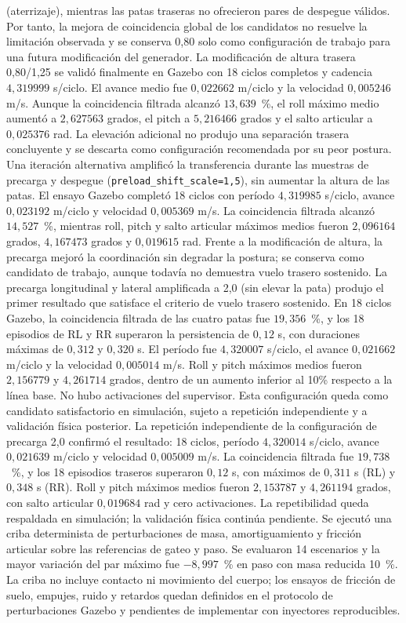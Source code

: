 (aterrizaje), mientras las patas traseras no ofrecieron pares de despegue
válidos. Por tanto, la mejora de coincidencia global de los candidatos no
resuelve la limitación observada y se conserva 0,80 solo como configuración de
trabajo para una futura modificación del generador.
La modificación de altura trasera 0,80/1,25 se validó finalmente en Gazebo con
18 ciclos completos y cadencia $4{,}319999$ s/ciclo. El avance medio fue
$0{,}022662$ m/ciclo y la velocidad $0{,}005246$ m/s. Aunque la coincidencia
filtrada alcanzó $13{,}639$~\%, el roll máximo medio aumentó a $2{,}627563$
grados, el pitch a $5{,}216466$ grados y el salto articular a $0{,}025376$ rad.
La elevación adicional no produjo una separación trasera concluyente y se
descarta como configuración recomendada por su peor postura.
Una iteración alternativa amplificó la transferencia durante las muestras de
precarga y despegue (\texttt{preload\_shift\_scale=1,5}), sin aumentar la altura de las
patas. El ensayo Gazebo completó 18 ciclos con período $4{,}319985$ s/ciclo,
avance $0{,}023192$ m/ciclo y velocidad $0{,}005369$ m/s. La coincidencia
filtrada alcanzó $14{,}527$~\%, mientras roll, pitch y salto articular máximos
medios fueron $2{,}096164$ grados, $4{,}167473$ grados y $0{,}019615$ rad.
Frente a la modificación de altura, la precarga mejoró la coordinación sin
degradar la postura; se conserva como candidato de trabajo, aunque todavía no
demuestra vuelo trasero sostenido.
La precarga longitudinal y lateral amplificada a 2,0 (sin elevar la pata)
produjo el primer resultado que satisface el criterio de vuelo trasero sostenido.
En 18 ciclos Gazebo, la coincidencia filtrada de las cuatro patas fue
$19{,}356$~\%, y los 18 episodios de RL y RR superaron la persistencia de
$0{,}12$ s, con duraciones máximas de $0{,}312$ y $0{,}320$ s. El período fue
$4{,}320007$ s/ciclo, el avance $0{,}021662$ m/ciclo y la velocidad
$0{,}005014$ m/s. Roll y pitch máximos medios fueron $2{,}156779$ y
$4{,}261714$ grados, dentro de un aumento inferior al 10\% respecto a la línea
base. No hubo activaciones del supervisor. Esta configuración queda como
candidato satisfactorio en simulación, sujeto a repetición independiente y a
validación física posterior.
La repetición independiente de la configuración de precarga 2,0 confirmó el
resultado: 18 ciclos, período $4{,}320014$ s/ciclo, avance $0{,}021639$
m/ciclo y velocidad $0{,}005009$ m/s. La coincidencia filtrada fue
$19{,}738$~\%, y los 18 episodios traseros superaron $0{,}12$ s, con máximos de
$0{,}311$ s (RL) y $0{,}348$ s (RR). Roll y pitch máximos medios fueron
$2{,}153787$ y $4{,}261194$ grados, con salto articular $0{,}019684$ rad y cero
activaciones. La repetibilidad queda respaldada en simulación; la validación
física continúa pendiente.
Se ejecutó una criba determinista de perturbaciones de masa, amortiguamiento y
fricción articular sobre las referencias de gateo y paso. Se evaluaron 14
escenarios y la mayor variación del par máximo fue $-8{,}997$~\% en paso con
masa reducida 10~\%. La criba no incluye contacto ni movimiento del cuerpo; los
ensayos de fricción de suelo, empujes, ruido y retardos quedan definidos en el
protocolo de perturbaciones Gazebo y pendientes de implementar con inyectores
reproducibles.


